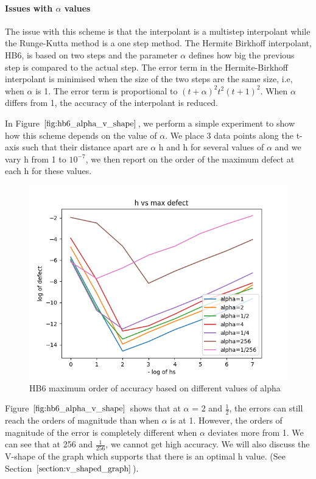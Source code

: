\documentclass{article}
\begin{document}
\paragraph{Issues with $\alpha$ values}
The issue with this scheme is that the interpolant is a multistep interpolant while the Runge-Kutta method is a one step method. The Hermite Birkhoff interpolant, HB6, is based on two steps and the parameter $\alpha$ defines how big the previous step is compared to the actual step. The error term in the Hermite-Birkhoff interpolant is minimised when the size of the two steps are the same size, i.e, when $\alpha$ is 1. The error term is proportional to $(t + \alpha)^2t^2(t + 1)^2$. When $\alpha$ differs from 1, the accuracy of the interpolant is reduced.

In Figure $\ref{fig:hb6_alpha_v_shape}$, we perform a simple experiment to show how this scheme depends on the value of $\alpha$. We place 3 data points along the t-axis such that their distance apart are $\alpha$ h and h for several values of $\alpha$ and we vary h from 1 to $10^{-7}$, we then report on the order of the maximum defect at each h for these values.

\begin{figure}[H]
\centering
\includegraphics[width=0.7\linewidth]{./figures/hb6_alpha_v_shape}
\caption{HB6 maximum order of accuracy based on different values of alpha}
\label{fig:hb6_alpha_v_shape}
\end{figure}

Figure $\ref{fig:hb6_alpha_v_shape}$ shows that at $\alpha$ = 2 and $\frac{1}{2}$, the errors can still reach the orders of magnitude than when $\alpha$ is at 1. However, the orders of magnitude of the error is completely different when $\alpha$ deviates more from 1. We can see that at 256 and $\frac{1}{256}$, we cannot get high accuracy. We will also discuss the V-shape of the graph which supports that there is an optimal h value. (See Section $\ref{section:v_shaped_graph}$).
\end{document}
